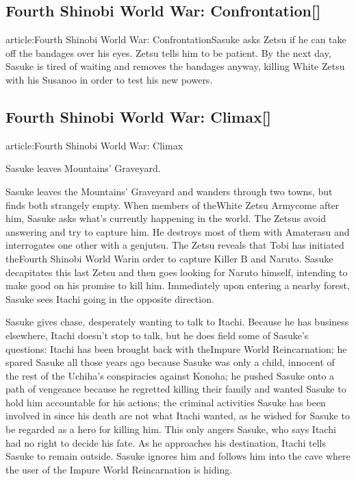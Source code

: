 \documentclass[a4paper,12pt]{article}
\begin{document}
\subsection*{Fourth Shinobi World War: Confrontation[]}\n\nMain article:Fourth Shinobi World War: ConfrontationSasuke asks Zetsu if he can take off the bandages over his eyes. Zetsu tells him to be patient. By the next day, Sasuke is tired of waiting and removes the bandages anyway, killing White Zetsu with his Susanoo in order to test his new powers.\\ \par \vspace{0.5cm}

\subsection*{Fourth Shinobi World War: Climax[]}\n\nMain article:Fourth Shinobi World War: Climax\\ \par \vspace{0.5cm}

Sasuke leaves Mountains' Graveyard.\\ \par \vspace{0.5cm}

Sasuke leaves the Mountains' Graveyard and wanders through two towns, but finds both strangely empty. When members of theWhite Zetsu Armycome after him, Sasuke asks what's currently happening in the world. The Zetsus avoid answering and try to capture him. He destroys most of them with Amaterasu and interrogates one other with a genjutsu. The Zetsu reveals that Tobi has initiated theFourth Shinobi World Warin order to capture Killer B and Naruto. Sasuke decapitates this last Zetsu and then goes looking for Naruto himself, intending to make good on his promise to kill him. Immediately upon entering a nearby forest, Sasuke sees Itachi going in the opposite direction.\\ \par \vspace{0.5cm}

Sasuke gives chase, desperately wanting to talk to Itachi. Because he has business elsewhere, Itachi doesn't stop to talk, but he does field some of Sasuke's questions: Itachi has been brought back with theImpure World Reincarnation; he spared Sasuke all those years ago because Sasuke was only a child, innocent of the rest of the Uchiha's conspiracies against Konoha; he pushed Sasuke onto a path of vengeance because he regretted killing their family and wanted Sasuke to hold him accountable for his actions; the criminal activities Sasuke has been involved in since his death are not what Itachi wanted, as he wished for Sasuke to be regarded as a hero for killing him. This only angers Sasuke, who says Itachi had no right to decide his fate. As he approaches his destination, Itachi tells Sasuke to remain outside. Sasuke ignores him and follows him into the cave where the user of the Impure World Reincarnation is hiding.\\ \par \vspace{0.5cm}
\end{document}
